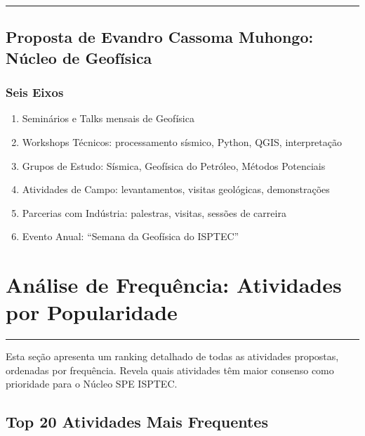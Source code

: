 \documentclass[12pt,a4paper]{article}
\newcommand{\proposalsep}{%
  \vspace{6pt}%
  {\color{gold}\rule{0.35\linewidth}{0.7pt}}%
  \vspace{4pt}%
}
\begin{document}
\proposalsep

\subsection{Proposta de Evandro Cassoma Muhongo: Núcleo de Geofísica}

\subsubsection*{Seis Eixos}
\begin{enumerate}
    \item Seminários e Talks mensais de Geofísica
    \item Workshops Técnicos: processamento sísmico, Python, QGIS, interpretação
    \item Grupos de Estudo: Sísmica, Geofísica do Petróleo, Métodos Potenciais
    \item Atividades de Campo: levantamentos, visitas geológicas, demonstrações
    \item Parcerias com Indústria: palestras, visitas, sessões de carreira
    \item Evento Anual: ``Semana da Geofísica do ISPTEC''
\end{enumerate}

\clearpage
\section{Análise de Frequência: Atividades por Popularidade}
\begin{center}{\color{gold}\rule{8cm}{0.6pt}}\end{center}

Esta seção apresenta um ranking detalhado de todas as atividades propostas, ordenadas por frequência. Revela quais atividades têm maior consenso como prioridade para o Núcleo SPE ISPTEC.

\subsection{Top 20 Atividades Mais Frequentes}
\end{document}
